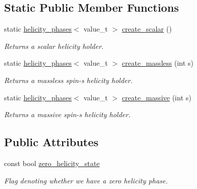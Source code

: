 \subsection*{Static Public Member Functions}
\begin{DoxyCompactItemize}
\item 
\hypertarget{a00271_a3b793e835178f97e46abe614c3511c53}{static \hyperlink{a00271}{helicity\-\_\-phases}$<$ value\-\_\-t $>$ \hyperlink{a00271_a3b793e835178f97e46abe614c3511c53}{create\-\_\-scalar} ()}\label{a00271_a3b793e835178f97e46abe614c3511c53}

\begin{DoxyCompactList}\small\item\em Returns a scalar helicity holder. \end{DoxyCompactList}\item 
\hypertarget{a00271_a4643d48b195159b06a0ca695a9f0ef9a}{static \hyperlink{a00271}{helicity\-\_\-phases}$<$ value\-\_\-t $>$ \hyperlink{a00271_a4643d48b195159b06a0ca695a9f0ef9a}{create\-\_\-massless} (int s)}\label{a00271_a4643d48b195159b06a0ca695a9f0ef9a}

\begin{DoxyCompactList}\small\item\em Returns a massless spin-\/s helicity holder. \end{DoxyCompactList}\item 
\hypertarget{a00271_aa4e25d80ab5d66f829d5150edf058e15}{static \hyperlink{a00271}{helicity\-\_\-phases}$<$ value\-\_\-t $>$ \hyperlink{a00271_aa4e25d80ab5d66f829d5150edf058e15}{create\-\_\-massive} (int s)}\label{a00271_aa4e25d80ab5d66f829d5150edf058e15}

\begin{DoxyCompactList}\small\item\em Returns a massive spin-\/s helicity holder. \end{DoxyCompactList}\end{DoxyCompactItemize}
\subsection*{Public Attributes}
\begin{DoxyCompactItemize}
\item 
\hypertarget{a00271_a9000d212d7d943c73228bcc6ac2ccdce}{const bool \hyperlink{a00271_a9000d212d7d943c73228bcc6ac2ccdce}{zero\-\_\-helicity\-\_\-state}}\label{a00271_a9000d212d7d943c73228bcc6ac2ccdce}

\begin{DoxyCompactList}\small\item\em Flag denoting whether we have a zero helicity phase. \end{DoxyCompactList}\end{DoxyCompactItemize}


